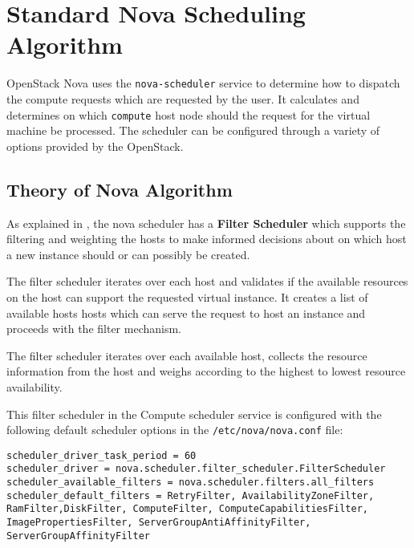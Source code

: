
\chapter{Standard Nova Scheduling Algorithm}\label{ch:novaalgorithm}

OpenStack Nova uses the \verb|nova-scheduler| service to determine how to dispatch the compute requests which are requested by the user.
It calculates and determines on which \verb|compute| host node should the request for the virtual machine be processed.
The scheduler can be configured through a variety of options provided by the OpenStack.


\section{Theory of Nova Algorithm}\label{sec:novaalgorithmtheory}

As explained in , the nova scheduler has a \textbf{Filter Scheduler} which supports the filtering and weighting the hosts to make informed decisions about on which host a new instance should or can possibly be created.

The filter scheduler iterates over each host and validates if the available resources on the host can support the requested virtual instance.
It creates a list of available hosts hosts which can serve the request to host an instance and proceeds with the filter mechanism.

The filter scheduler iterates over each available host, collects the resource information from the host and weighs according to the highest to lowest resource availability.

This filter scheduler in the Compute scheduler service is configured with the following default scheduler options in the \verb|/etc/nova/nova.conf| file:

\begin{lstlisting}[frame=single]
scheduler_driver_task_period = 60
scheduler_driver = nova.scheduler.filter_scheduler.FilterScheduler
scheduler_available_filters = nova.scheduler.filters.all_filters
scheduler_default_filters = RetryFilter, AvailabilityZoneFilter, RamFilter,DiskFilter, ComputeFilter, ComputeCapabilitiesFilter, ImagePropertiesFilter, ServerGroupAntiAffinityFilter, ServerGroupAffinityFilter
\end{lstlisting}

